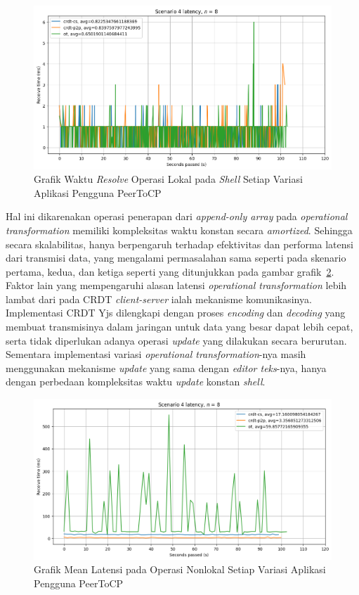 \begin{figure}
 \centering
 \includegraphics[width=15cm]{./assets/skripsi/benchmark-vis_cell_13_output_5}
 \caption{Grafik Waktu \textit{Resolve} Operasi Lokal pada \textit{Shell} Setiap Variasi Aplikasi Pengguna PeerToCP}
 \label{fig:13-5}
\end{figure}

Hal ini dikarenakan operasi penerapan dari \textit{append-only array} pada \textit{operational transformation} memiliki kompleksitas waktu konstan secara \textit{amortized}. Sehingga secara skalabilitas, hanya berpengaruh terhadap efektivitas dan performa latensi dari transmisi data, yang mengalami permasalahan sama seperti pada skenario pertama, kedua, dan ketiga seperti yang ditunjukkan pada gambar grafik~\ref{fig:9-5}. Faktor lain yang mempengaruhi alasan latensi \textit{operational transformation} lebih lambat dari pada CRDT \textit{client-server} ialah mekanisme komunikasinya. Implementasi CRDT Yjs dilengkapi dengan proses \textit{encoding} dan \textit{decoding} yang membuat transmisinya dalam jaringan untuk data yang besar dapat lebih cepat, serta tidak diperlukan adanya operasi \textit{update} yang dilakukan secara berurutan. Sementara implementasi variasi \textit{operational transformation}-nya masih menggunakan mekanisme \textit{update} yang sama dengan \textit{editor teks}-nya, hanya dengan perbedaan kompleksitas waktu \textit{update} konstan \textit{shell}.

\begin{figure}
 \centering
 \includegraphics[width=15cm]{./assets/skripsi/benchmark-vis_cell_9_output_5}
 \caption{Grafik Mean Latensi pada Operasi Nonlokal Setiap Variasi Aplikasi Pengguna PeerToCP}
 \label{fig:9-5}
\end{figure}

